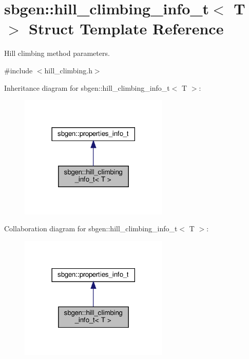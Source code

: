 \hypertarget{structsbgen_1_1hill__climbing__info__t}{}\section{sbgen\+:\+:hill\+\_\+climbing\+\_\+info\+\_\+t$<$ T $>$ Struct Template Reference}
\label{structsbgen_1_1hill__climbing__info__t}


Hill climbing method parameters.  




{\ttfamily \#include $<$hill\+\_\+climbing.\+h$>$}



Inheritance diagram for sbgen\+:\+:hill\+\_\+climbing\+\_\+info\+\_\+t$<$ T $>$\+:
\nopagebreak
\begin{figure}[H]
\begin{center}
\leavevmode
\includegraphics[width=201pt]{structsbgen_1_1hill__climbing__info__t__inherit__graph}
\end{center}
\end{figure}


Collaboration diagram for sbgen\+:\+:hill\+\_\+climbing\+\_\+info\+\_\+t$<$ T $>$\+:
\nopagebreak
\begin{figure}[H]
\begin{center}
\leavevmode
\includegraphics[width=201pt]{structsbgen_1_1hill__climbing__info__t__coll__graph}
\end{center}
\end{figure}

